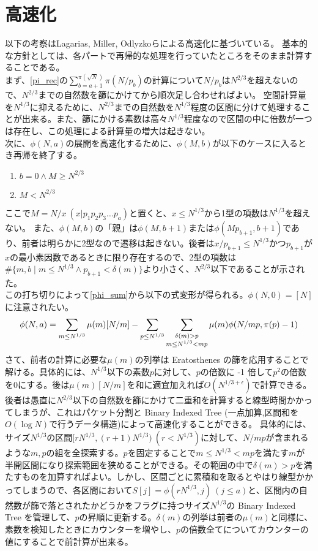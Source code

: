 \documentclass[a4paper]{jsarticle}
\begin{document}
\section{高速化}
以下の考察はLagarias, Miller, Odlyzkoらによる高速化に基づいている。
基本的な方針としては、各パートで再帰的な処理を行っていたところをそのまま計算することである。\\
まず、\eqref{pi_rec}の$\displaystyle \sum_{b=a+1}^{\pi(\sqrt{N})} \pi(N/p_b)$の計算について$N/p_b$は$N^{2/3}$を超えないので、$N^{2/3}$までの自然数を篩にかけてから順次足し合わせればよい。
空間計算量を$N^{1/3}$に抑えるために、$N^{2/3}$までの自然数を$N^{1/3}$程度の区間に分けて処理することが出来る。また、篩にかける素数は高々$N^{1/3}$程度なので区間の中に倍数が一つは存在し、この処理による計算量の増大は起きない。 \\
次に、$\phi(N,a)$の展開を高速化するために、$\phi(M,b)$が以下のケースに入るとき再帰を終了する。
\begin{enumerate}
\item $b=0 \land M \geq N^{2/3}$
\item $M<N^{2/3}$
\end{enumerate}
ここで$M=N/x \ (x|p_1 p_2 p_3 \ldots p_a)$と置くと、$x \leq N^{1/3}$から1型の項数は$N^{1/3}$を超えない。
また、$\phi(M,b)$の「親」は$\phi(M,b+1)$または$\phi(M p_{b+1},b+1)$であり、前者は明らかに2型なので遷移は起きない。後者は$x/p_{b+1} \leq N^{1/3}$かつ$p_{b+1}$が$x$の最小素因数であるときに限り存在するので、2型の項数は$\#\{m,b \mid m \leq N^{1/3} \land p_{b+1}<\delta(m)\}$より小さく、$N^{2/3}$以下であることが示された。 \\
この打ち切りによって\eqref{phi_sum}から以下の式変形が得られる。$\phi(N,0)=[N]$に注意されたい。
\begin{equation}
    \displaystyle
    \phi(N,a)=\sum_{m \leq N^{1/3}} \mu(m) [N/m]\\
    -\sum_{p \leq N^{1/3}} \sum_{\substack{\delta(m)>p \\ m \leq N^{1/3} < mp}} \mu(m) \phi(N/mp,\pi(p)-1)
\end{equation}
さて、前者の計算に必要な$\mu(m)$の列挙は Eratosthenes の篩を応用することで解ける。具体的には、$N^{1/3}$以下の素数$p$に対して、$p$の倍数に -1 倍して$p^2$の倍数を0にする。後は$\mu(m) [N/m]$を和に適宜加えれば$O(N^{1/3+\epsilon})$で計算できる。 \\
後者は愚直に$N^{2/3}$以下の自然数を篩にかけて二重和を計算すると線型時間かかってしまうが、これはパケット分割と Binary Indexed Tree (一点加算,区間和を$O(\log N)$で行うデータ構造)によって高速化することができる。
具体的には、サイズ$N^{1/3}$の区間$[r N^{1/3},(r+1) N^{1/3}) \ (r<N^{1/3})$に対して、$N/mp$が含まれるような${m,p}$の組を全探索する。$p$を固定することで$m \leq N^{1/3} < mp$を満たす$m$が半開区間になり探索範囲を狭めることができる。その範囲の中で$\delta(m)>p$を満たすものを加算すればよい。しかし、区間ごとに累積和を取るとやはり線型かかってしまうので、各区間において$S[j]=\phi(r N^{1/3},j) \ (j \leq a)$と、区間内の自然数が篩で落とされたかどうかをフラグに持つサイズ$N^{1/3}$の Binary Indexed Tree を管理して、$p$の昇順に更新する。$\delta(m)$の列挙は前者の$\mu(m)$と同様に、素数を検知したときにカウンターを増やし、$p$の倍数全てについてカウンターの値にすることで前計算が出来る。 \\
\end{document}
